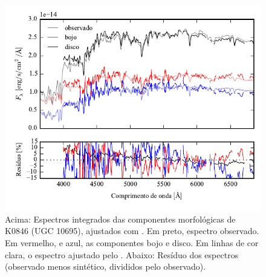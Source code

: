 \begin{figure}
	\includegraphics[page=11]{figuras/sample006a_synthesis}
	\caption[Espectros ajustados com \starlight das componentes morfológicas de
	K0846 (UGC 10695)]
	{Acima: Espectros integrados das componentes morfológicas de
	K0846 (UGC 10695), ajustados com \starlight. Em preto, espectro observado. Em
	vermelho, e azul, as componentes bojo e disco. Em linhas de cor clara, o
	espectro ajustado pelo \starlight. Abaixo: Resíduo dos espectros (observado
	menos sintético, divididos pelo observado).}
	\label{fig:decompSintese:K0846}
\end{figure}

